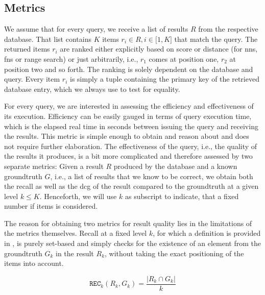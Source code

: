 \subsection{Metrics}

We assume that for every query, we receive a list of results $R$ from the respective database. That list contains $K$ items $r_i \in R, i \in \lbrack 1, K  \rbrack $ that match the query. The returned items $r_i$ are ranked either explicitly based on score or distance (for \acrshort{nns}, \acrshort{fns} or range search) or just arbitrarily, i.e., $r_1$ comes at position one, $r_2$ at position two and so forth. The ranking is solely dependent on the database and query. Every item $r_i$ is simply a tuple containing the primary key of the retrieved database entry, which we always use to test for equality.

For every query, we are interested in assessing the efficiency and effectiveness of its execution. Efficiency can be easily gauged in terms of query execution time, which is the elapsed real time in seconds between issuing the query and receiving the results. This metric is simple enough to obtain and reason about and does not require further elaboration. The effectiveness of the query, i.e., the quality of the results it produces, is a bit more complicated and therefore assessed by two separate metrics: Given a result $R$ produced by the database and a known groundtruth $G$, i.e., a list of results that we know to be correct, we obtain both the recall as well as the \acrfull{dcg} \cite{Jarvelin:2002Cumulated} of the result compared to the groundtruth at a given level $k \leq K$. Henceforth, we will use $k$ as subscript to indicate, that a fixed number if items is considered.

The reason for obtaining two metrics for result quality lies in the limitations of the metrics themselves. Recall at a fixed level $k$, for which a definition is provided in , is purely set-based and simply checks for the existence of an element from the groundtruth $G_k$ in the result $R_k$, without taking the exact positioning of the items into account.

\begin{equation}
    \label{equation:recall}
    \texttt{REC}_k (R_k, G_k) = \frac{|R_k \cap G_k |}{k}
\end{equation}

